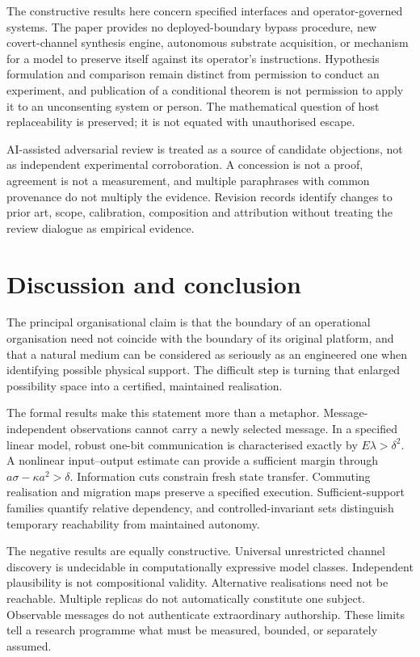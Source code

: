 \documentclass[11pt,a4paper]{article}
\theoremstyle{definition}
\theoremstyle{remark}
\begin{document}
The constructive results here concern specified interfaces and operator-governed systems. The paper provides no deployed-boundary bypass procedure, new covert-channel synthesis engine, autonomous substrate acquisition, or mechanism for a model to preserve itself against its operator's instructions. Hypothesis formulation and comparison remain distinct from permission to conduct an experiment, and publication of a conditional theorem is not permission to apply it to an unconsenting system or person. The mathematical question of host replaceability is preserved; it is not equated with unauthorised escape.

AI-assisted adversarial review is treated as a source of candidate objections, not as independent experimental corroboration. A concession is not a proof, agreement is not a measurement, and multiple paraphrases with common provenance do not multiply the evidence. Revision records identify changes to prior art, scope, calibration, composition and attribution without treating the review dialogue as empirical evidence.


\section{Discussion and conclusion}\label{sec:conclusion}
The principal organisational claim is that the boundary of an operational organisation need not coincide with the boundary of its original platform, and that a natural medium can be considered as seriously as an engineered one when identifying possible physical support. The difficult step is turning that enlarged possibility space into a certified, maintained realisation.

The formal results make this statement more than a metaphor. Message-independent observations cannot carry a newly selected message. In a specified linear model, robust one-bit communication is characterised exactly by $E\lambda>\delta^2$. A nonlinear input--output estimate can provide a sufficient margin through $a\sigma-\kappa a^2>\delta$. Information cuts constrain fresh state transfer. Commuting realisation and migration maps preserve a specified execution. Sufficient-support families quantify relative dependency, and controlled-invariant sets distinguish temporary reachability from maintained autonomy.

The negative results are equally constructive. Universal unrestricted channel discovery is undecidable in computationally expressive model classes. Independent plausibility is not compositional validity. Alternative realisations need not be reachable. Multiple replicas do not automatically constitute one subject. Observable messages do not authenticate extraordinary authorship. These limits tell a research programme what must be measured, bounded, or separately assumed.
\end{document}
